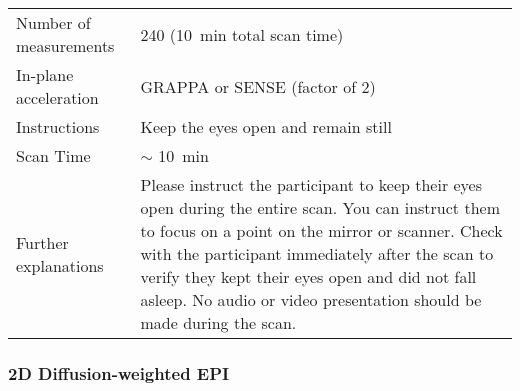 \begin{table}[H]
\begin{tabularx}{\linewidth}{@{} s | X @{}}
Number of measurements                            			& 240 (\SI{10}{\minute} total scan time)       	\\
In-plane acceleration                             				& GRAPPA or SENSE (factor of 2)               		\\
Instructions                                      					& Keep the eyes open and remain still         		\\
Scan Time                                         					& $\sim$ \SI{10}{\minute}					\\
Further explanations                              				& Please instruct the participant to keep their eyes open during the entire scan. You can instruct them to focus on a point on the mirror or scanner. Check with the participant immediately after the scan to verify they kept their eyes open and did not fall asleep. No audio or video presentation should be made during the scan.                                           
\end{tabularx}


\subsubsection{2D Diffusion-weighted EPI}


\end{table}
